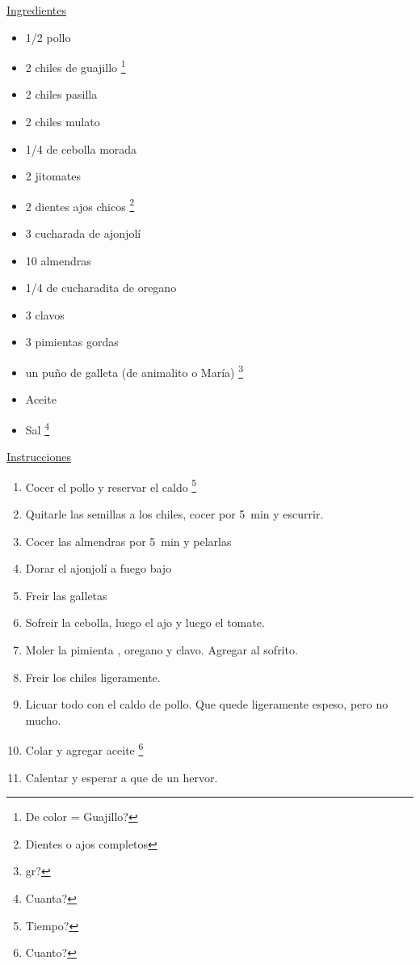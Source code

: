 \underline{Ingredientes}
\begin{itemize}
\item \num{1/2} pollo
\item 2 chiles de guajillo \footnote{De color = Guajillo?}
\item 2 chiles pasilla
\item 2 chiles mulato
\item \num{1/4} de cebolla morada
\item 2 jitomates
\item 2 dientes ajos chicos \footnote{Dientes o ajos completos}
\item 3 cucharada de ajonjolí
\item 10 almendras
\item \num{1/4} de cucharadita de oregano
\item 3 clavos
\item 3 pimientas gordas
\item un puño de galleta (de animalito o María) \footnote{gr?}
\item Aceite
\item Sal \footnote{Cuanta?}
\end{itemize}

\underline{Instrucciones}
\begin{enumerate}
\item Cocer el pollo y reservar el caldo \footnote{Tiempo?}
\item Quitarle las semillas a los chiles, cocer por \SI{5}{min} y escurrir.
\item Cocer las almendras por \SI{5}{min} y pelarlas
\item Dorar el ajonjolí a fuego bajo
\item Freir las galletas
\item Sofreir la cebolla, luego el ajo y luego el tomate.
\item Moler la pimienta , oregano y clavo. Agregar al sofrito.
\item Freir los chiles ligeramente.
\item Licuar todo con el caldo de pollo. Que quede ligeramente espeso, pero no mucho.
\item Colar y agregar aceite \footnote{Cuanto?}
\item Calentar y esperar a que de un hervor.
\end{enumerate}